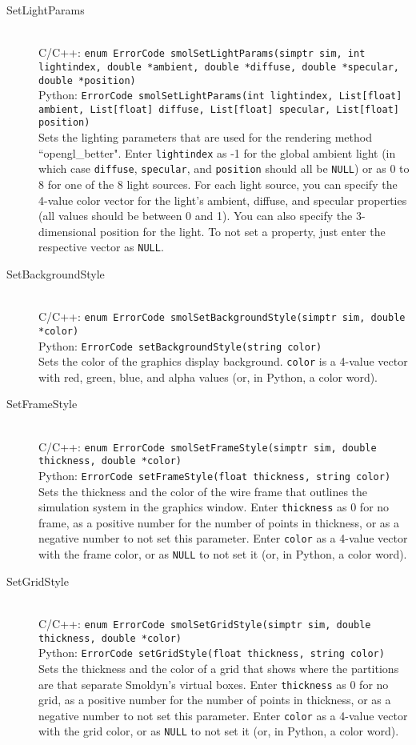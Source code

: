 \documentclass {scrbook}
\newcommand {\ttt} {\texttt}
\begin{document}
\begin{description}
\item[SetLightParams]
\hfill \\
C/C++: \ttt{enum ErrorCode smolSetLightParams(simptr sim, int lightindex, double *ambient, double *diffuse, double *specular, double *position)}\\
Python: \ttt{ErrorCode smolSetLightParams(int lightindex, List[float] ambient, List[float] diffuse, List[float] specular, List[float] position)}\\
Sets the lighting parameters that are used for the rendering method ``opengl\_better". Enter \ttt{lightindex} as -1 for the global ambient light (in which case \ttt{diffuse}, \ttt{specular}, and \ttt{position} should all be \ttt{NULL}) or as 0 to 8 for one of the 8 light sources. For each light source, you can specify the 4-value color vector for the light's ambient, diffuse, and specular properties (all values should be between 0 and 1). You can also specify the 3-dimensional position for the light. To not set a property, just enter the respective vector as \ttt{NULL}.

\item[SetBackgroundStyle]
\hfill \\
C/C++: \ttt{enum ErrorCode smolSetBackgroundStyle(simptr sim, double *color)}\\
Python: \ttt{ErrorCode setBackgroundStyle(string color)}\\
Sets the color of the graphics display background. \ttt{color} is a 4-value vector with red, green, blue, and alpha values (or, in Python, a color word).

\item[SetFrameStyle]
\hfill \\
C/C++: \ttt{enum ErrorCode smolSetFrameStyle(simptr sim, double thickness, double *color)}\\
Python: \ttt{ErrorCode setFrameStyle(float thickness, string color)}\\
Sets the thickness and the color of the wire frame that outlines the simulation system in the graphics window. Enter \ttt{thickness} as 0 for no frame, as a positive number for the number of points in thickness, or as a negative number to not set this parameter. Enter \ttt{color} as a 4-value vector with the frame color, or as \ttt{NULL} to not set it (or, in Python, a color word).

\item[SetGridStyle]
\hfill \\
C/C++: \ttt{enum ErrorCode smolSetGridStyle(simptr sim, double thickness, double *color)}\\
Python: \ttt{ErrorCode setGridStyle(float thickness, string color)}\\
Sets the thickness and the color of a grid that shows where the partitions are that separate Smoldyn's virtual boxes. Enter \ttt{thickness} as 0 for no grid, as a positive number for the number of points in thickness, or as a negative number to not set this parameter. Enter \ttt{color} as a 4-value vector with the grid color, or as \ttt{NULL} to not set it (or, in Python, a color word).


\end{description}
\end{document}
